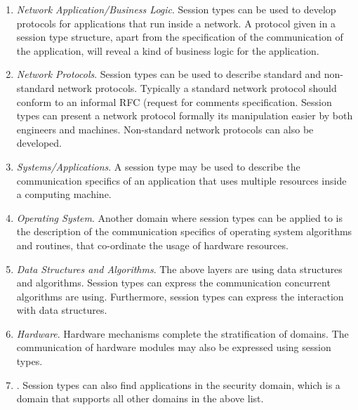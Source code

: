 \begin{enumerate}
	\item	{\em Network Application/Business Logic}.
	Session types can be used to develop protocols for applications
	that run inside a network.
	A protocol given in a session type structure, apart from the
	specification of the communication of the application, will
	reveal a kind of business logic for the application.
	
	\item	{\em Network Protocols}.
	Session types can be used to describe standard and non-standard network protocols.
	Typically a standard network protocol should conform to
	an informal RFC (request for comments specification. Session types
	can present a network protocol formally its manipulation easier
	by both engineers and machines.
	Non-standard network protocols can also be developed.
	
	
	\item	{\em Systems/Applications}.
	A session type may be used to describe the communication
	specifics of an application that uses multiple resources
	inside a computing machine.
	
	\item	{\em Operating System}.
	Another domain where session types can be applied to
	is the description of the communication specifics
	of operating system algorithms and routines, that
	co-ordinate the usage of hardware resources.
	
	\item	{\em Data Structures and Algorithms}.
	The above layers are using data structures and algorithms.
	Session types can express the communication
	concurrent algorithms are using. Furthermore, session types
	can express the interaction with data structures.
	
	\item	{\em Hardware}.
	Hardware mechanisms complete the stratification of domains.
	The communication of hardware modules may also be expressed
	using session types.
	
	\item	{}.
	Session types can also find applications in the security domain,
	which is a domain that supports all other domains in the above list.
\end{enumerate}
